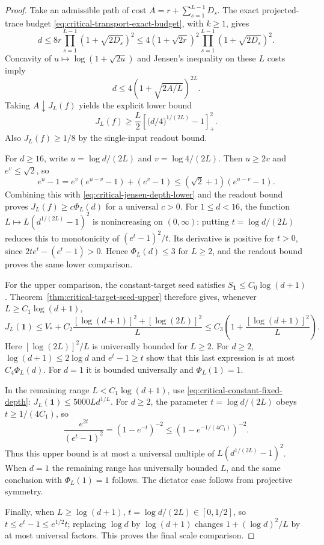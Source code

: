 \begin{proof}
Take an admissible path of cost
$A=r+\sum_{s=1}^{L-1}D_s$. The exact projected-trace budget
\eqref{eq:critical-transport-exact-budget}, with $k\ge1$, gives
\[
 d\le8r\prod_{s=1}^{L-1}(1+\sqrt{2D_s})^2
 \le4(1+\sqrt{2r})^2
           \prod_{s=1}^{L-1}(1+\sqrt{2D_s})^2.
\]
Concavity of $u\mapsto\log(1+\sqrt{2u})$ and Jensen's inequality
on these $L$ costs imply
\[
 d\le4(1+\sqrt{2A/L})^{2L}.
\]
Taking $A\downarrow J_L(f)$ yields the explicit lower bound
\begin{equation}
 J_L(f)\ge\frac L2
 \left[\bigl(d/4\bigr)^{1/(2L)}-1\right]_+^2.
 \label{eq:critical-jensen-depth-lower}
\end{equation}
Also $J_L(f)\ge1/8$ by the single-input readout bound.

For $d\ge16$, write $u=\log d/(2L)$ and $v=\log4/(2L)$.
Then $u\ge2v$ and $e^v\le\sqrt2$, so
\[
 e^u-1=e^v(e^{u-v}-1)+(e^v-1)
       \le(\sqrt2+1)(e^{u-v}-1).
\]
Combining this with \eqref{eq:critical-jensen-depth-lower} and the
readout bound proves $J_L(f)\ge c\Phi_L(d)$ for a universal $c>0$.
For $1\le d<16$, the function
$L\mapsto L(d^{1/(2L)}-1)^2$ is nonincreasing on $(0,\infty)$:
putting $t=\log d/(2L)$ reduces this to monotonicity of
$(e^t-1)^2/t$. Its derivative is positive for $t>0$, since
$2te^t-(e^t-1)>0$. Hence $\Phi_L(d)\le3$ for $L\ge2$,
and the readout bound proves the same lower comparison.

For the upper comparison, the constant-target seed satisfies
$S_{\mathbf1}\le C_0\log(d+1)$.
Theorem~\ref{thm:critical-target-seed-upper} therefore gives, whenever
$L\ge C_1\log(d+1)$,
\[
 J_L(\mathbf1)
 \le V_*+C_2\frac{[\log(d+1)]^2+[\log(2L)]^2}{L}
 \le C_3\left(1+\frac{[\log(d+1)]^2}{L}\right).
\]
Here $[\log(2L)]^2/L$ is universally bounded for $L\ge2$.
For $d\ge2$, $\log(d+1)\le2\log d$ and
$e^t-1\ge t$ show that this last expression is at most
$C_4\Phi_L(d)$. For $d=1$ it is bounded universally and
$\Phi_L(1)=1$.

In the remaining range $L<C_1\log(d+1)$, use
\eqref{eq:critical-constant-fixed-depth}:
$J_L(\mathbf1)\le5000L d^{1/L}$.
For $d\ge2$, the parameter $t=\log d/(2L)$ obeys
$t\ge1/(4C_1)$, so
\[
 \frac{e^{2t}}{(e^t-1)^2}
       =(1-e^{-t})^{-2}\le(1-e^{-1/(4C_1)})^{-2}.
\]
Thus this upper bound is at most a universal multiple of
$L(d^{1/(2L)}-1)^2$. When $d=1$ the remaining range has universally
bounded $L$, and the same conclusion with $\Phi_L(1)=1$ follows.
The dictator case follows from projective symmetry.

Finally, when $L\ge\log(d+1)$, $t=\log d/(2L)\in[0,1/2]$,
so $t\le e^t-1\le e^{1/2}t$; replacing $\log d$ by
$\log(d+1)$ changes $1+(\log d)^2/L$ by at most universal factors.
This proves the final scale comparison.
\end{proof}
